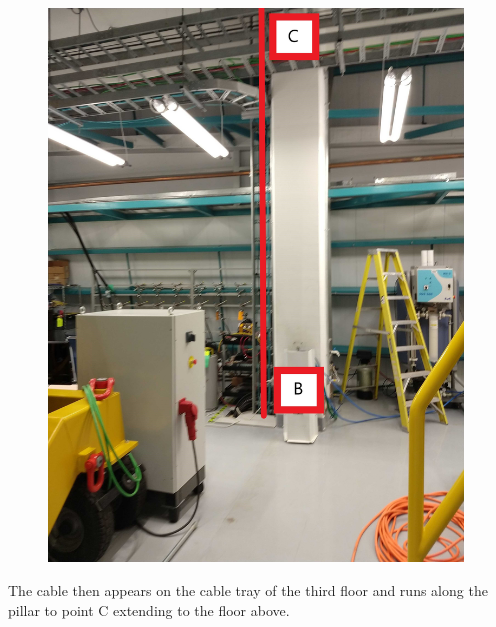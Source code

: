 \begin{figure}
  \includegraphics[width=11cm]{images/13.jpg}
  \centering
  \label{fig:jlsimon}
\end{figure}

  The cable then appears on the cable tray of the third floor and runs along the pillar to point C extending to the floor above.


